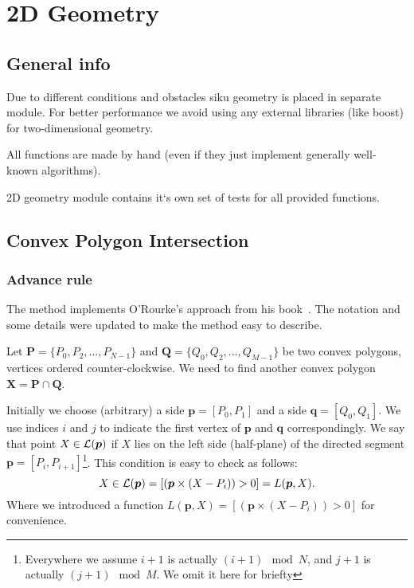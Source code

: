 
\chapter{2D Geometry}\label{ch:geometry2d}


\section{General info}

Due to different conditions and obstacles siku geometry is placed in
separate module. For better performance we avoid using any external
libraries (like boost) for two-dimensional geometry. 

All functions are made by hand (even if they just implement generally 
well-known algorithms).

2D geometry module contains it`s own set of tests for all provided
functions.

\section{Convex Polygon Intersection}

\subsection{Advance rule}

The method implements O'Rourke's approach from his
book~\cite{bib:orourke}. The notation and some details were updated to
make the method easy to describe.

Let $\bm{P}=\{P_0,P_2,\dots,P_{N-1}\}$ and
$\bm{Q}=\{Q_0,Q_2,\dots,Q_{M-1}\}$ be two convex polygons, vertices
ordered counter-clockwise. We need to find another convex polygon
$\bm{X}=\bm{P}\cap\bm{Q}$.

Initially we choose (arbitrary) a side $\bm{p}=[P_0,P_1]$ and a side
$\bm{q}=[Q_0,Q_1]$. We use indices $i$ and $j$ to indicate the
first vertex of $\bm{p}$ and $\bm{q}$ correspondingly. 
We say that point $X\in {\cal L}(\bm{p})$ if $X$ lies on the left side
(half-plane) of the directed segment
$\bm{p}=[P_i,P_{i+1}]$\footnote{Everywhere we assume $i+1$ is actually
$(i+1) \mod N$, and $j+1$ is actually $(j+1)\mod M$. We omit it here
  for briefty}. This
condition is easy to check as follows:
\begin{equation}
  X \in {\cal L}(\bm{p}) =
  \left[ \left( { \bm{p} \times (X-P_i) } \right) > 0 \right]
  = L ( \bm{p}, X ).
\end{equation}
Where we introduced a function $L(\bm{p},X) = \left[\left( { \bm{p}
    \times (X-P_i) } \right) > 0\right]$ for convenience.

